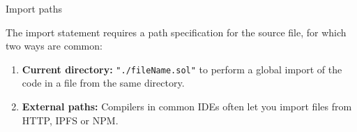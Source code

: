 \documentclass[]{beamer}
\begin{document}
\begin{frame}{Import paths}

\vspace{0.5em}
The import statement requires a path specification for the source file, for which two ways are common:
\vspace{0.5em}

\begin{enumerate}
	\item	\textbf{Current directory:}  \color{red} \texttt{{"./fileName.sol"}} \color{black} to perform a global import of the code in a file from the same directory.
	\item	\textbf{External paths:} Compilers in common IDEs often let you import files from HTTP, IPFS or NPM.
\end{enumerate}

\vspace{0.5em}


\end{frame}
\end{document}
